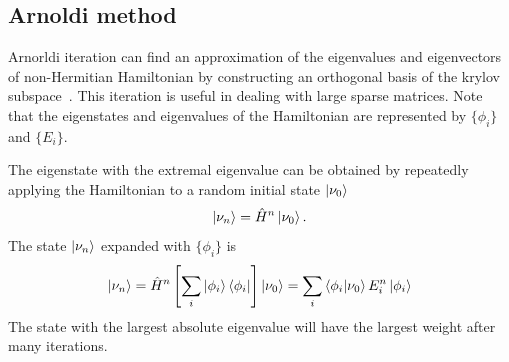 \documentclass[longbibliography, aps, prx, amsmath, amssymb, amsfonts, twocolumn,superscriptaddress, footinbib]{revtex4-1}
\begin{document}
	
	\subsection{Arnoldi method}

	Arnorldi iteration can find an approximation of the eigenvalues and eigenvectors of non-Hermitian Hamiltonian by constructing an orthogonal basis of the krylov subspace~\cite{arnoldi1951principle}. This iteration is useful in dealing with large sparse matrices. Note that the eigenstates and eigenvalues of the Hamiltonian are represented by $\{\phi_i \}$ and $\{E_i\}$.

	The eigenstate with the extremal eigenvalue can be obtained by repeatedly applying the Hamiltonian to a random initial state $\ket{\nu_0}$
	\begin{equation}
		\ket{\nu_n} = \hat{H}^n \ket{\nu_0}.
	\end{equation}
	The state $\ket{\nu_n}$ expanded with $\{\phi_i \}$ is 
	\begin{equation}
		\ket{\nu_n} = \hat{H}^n \left[ \sum_i \ket{\phi_i} \bra{\phi_i}\right] \ket{\nu_0} = \sum_i \bra{\phi_i} \ket{\nu_0} E_i^n\ket{\phi_i}
	\end{equation}
	The state with the largest absolute eigenvalue will have the largest weight after many iterations. 
\end{document}
